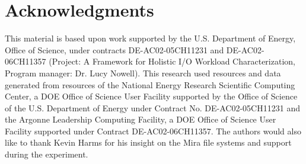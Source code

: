 \section*{Acknowledgments}
This material is based upon work supported by the U.S. Department of Energy,
Office of Science, under contracts DE-AC02-05CH11231 and DE-AC02-06CH11357
(Project: A Framework for Holistic I/O Workload Characterization, Program
manager: Dr. Lucy Nowell).
This research used resources and data generated from resources of the
National Energy Research Scientific Computing Center, a DOE Office of
Science
User Facility supported by the Office of Science of the U.S. Department of
Energy under Contract No. DE-AC02-05CH11231 and the Argonne Leadership
Computing Facility, a DOE Office of Science User Facility supported under
Contract DE-AC02-06CH11357.  The authors would also like to thank Kevin Harms for his insight on the Mira file systems and support during the experiment.